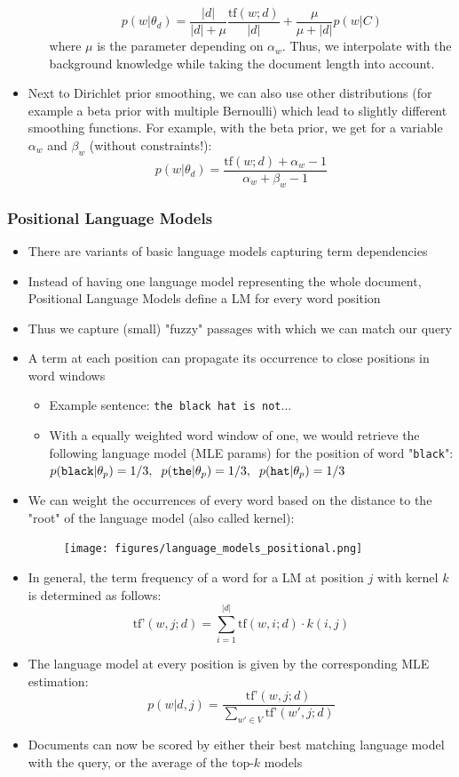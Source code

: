 \begin{itemize}
\begin{itemize}
		$$p(w|\theta_d) = \frac{|d|}{|d|+ \mu}\frac{\text{tf}(w;d)}{|d|} + \frac{\mu}{\mu + |d|}p(w|C)$$
		where $\mu$ is the parameter depending on $\alpha_w$. Thus, we interpolate with the background knowledge while taking the document length into account.
	\end{itemize}
	\item Next to Dirichlet prior smoothing, we can also use other distributions (for example a beta prior with multiple Bernoulli) which lead to slightly different smoothing functions. For example, with the beta prior, we get for a variable $\alpha_w$ and $\beta_w$ (without constraints!):
	$$p(w|\theta_d) = \frac{\text{tf}(w;d) + \alpha_w - 1}{\alpha_w + \beta_w - 1}$$
\end{itemize}
\subsubsection{Positional Language Models}
\begin{itemize}
	\item There are variants of basic language models capturing term dependencies
	\item Instead of having one language model representing the whole document, Positional Language Models define a LM for every word position
	\item Thus we capture (small) "fuzzy" passages with which we can match our query
	\item A term at each position can propagate its occurrence to close positions in word windows
	\begin{itemize}
		\item Example sentence: \texttt{the black hat is not}...
		\item With a equally weighted word window of one, we would retrieve the following language model (MLE params) for the position of word "\texttt{black}": $p(\texttt{black}|\theta_p) = 1/3, \hspace{2mm} p(\texttt{the}|\theta_p) = 1/3, \hspace{2mm} p(\texttt{hat}|\theta_p) = 1/3$
	\end{itemize}
	\item We can weight the occurrences of every word based on the distance to the "root" of the language model (also called kernel):
	\begin{figure}[ht]
		\centering
		\texttt{[image: figures/language\_models\_positional.png]}
		\label{img:language_models_positional}
	\end{figure}
	\item In general, the term frequency of a word for a LM at position $j$ with kernel $k$ is determined as follows:
	$$\text{tf'}(w,j;d) = \sum\limits_{i=1}^{|d|} \text{tf}(w,i;d) \cdot k(i,j) $$
	\item The language model at every position is given by the corresponding MLE estimation:
	$$p(w|d,j) = \frac{\text{tf'}(w,j;d)}{\sum_{w'\in V} \text{tf'}(w',j;d)}$$
	\item Documents can now be scored by either their best matching language model with the query, or the average of the top-$k$ models
\end{itemize}